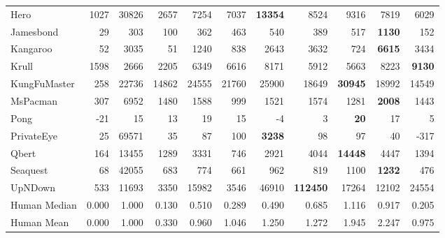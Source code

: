 \begin{tabular}{l|rr|rrrrrrr|r}
    Hero           & 1027   & 30826 & 2657   & 7254  & 7037  & \bf 13354 & 8524        & 9316          & 7819      & 6029     \\
    Jamesbond      & 29     & 303   & 100    & 362   & 463   & 540       & 389         & 517           & \bf 1130  & 152      \\
    Kangaroo       & 52     & 3035  & 51     & 1240  & 838   & 2643      & 3632        & 724           & \bf 6615  & 3434     \\
    Krull          & 1598   & 2666  & 2205   & 6349  & 6616  & 8171      & 5912        & 5663          & 8223      & \bf 9130 \\
    KungFuMaster   & 258    & 22736 & 14862  & 24555 & 21760 & 25900     & 18649       & \bf 30945     & 18992     & 14549    \\
    MsPacman       & 307    & 6952  & 1480   & 1588  & 999   & 1521      & 1574        & 1281          & \bf 2008  & 1443     \\
    Pong           & -21    & 15    & 13     & 19    & 15    & -4        & 3           & \bf 20        & 17        & 5        \\
    PrivateEye     & 25     & 69571 & 35     & 87    & 100   & \bf 3238  & 98          & 97            & 40        & -317     \\
    Qbert          & 164    & 13455 & 1289   & 3331  & 746   & 2921      & 4044        & \bf 14448     & 4447      & 1394     \\
    Seaquest       & 68     & 42055 & 683    & 774   & 661   & 962       & 819         & 1100          & \bf 1232  & 476      \\
    UpNDown        & 533    & 11693 & 3350   & 15982 & 3546  & 46910     & \bf  112450 & 17264         & 12102     & 24554    \\
    \midrule
    Human Median   & 0.000  & 1.000 & 0.130  & 0.510 & 0.289 & 0.490     & 0.685       & 1.116         & 0.917     & 0.205    \\
    Human Mean     & 0.000  & 1.000 & 0.330  & 0.960 & 1.046 & 1.250     & 1.272       & 1.945         & 2.247     & 0.975    \\
    \bottomrule
\end{tabular}